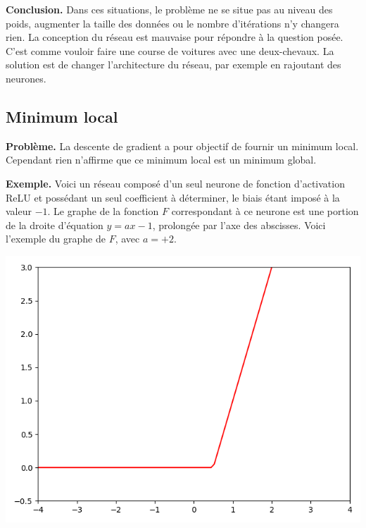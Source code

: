 \bigskip

\textbf{Conclusion.} Dans ces situations, le problème ne se situe pas au niveau des poids, augmenter la taille des données ou le nombre d'itérations n'y changera rien. La conception du réseau est mauvaise pour répondre à la question posée. C'est comme vouloir faire une course de voitures avec une deux-chevaux. La solution est de changer l'architecture du réseau, par exemple en rajoutant des neurones.

\subsection{Minimum local}


\textbf{Problème.} La descente de gradient a pour objectif de fournir un minimum local. 
Cependant rien n'affirme que ce minimum local est un minimum global.

\bigskip

\textbf{Exemple.}
Voici un réseau composé d'un seul neurone de fonction d'activation ReLU et possédant un seul coefficient à déterminer, le biais étant imposé à la valeur $-1$.
Le graphe de la fonction $F$ correspondant à ce neurone est une portion de la droite d'équation $y=ax-1$, prolongée par l'axe des abscisses. Voici l'exemple du graphe de $F$, avec $a=+2$. 

\begin{center}
	\includegraphics[scale=\myscale,scale=0.45]{figures/retro_04_d}
\end{center}

